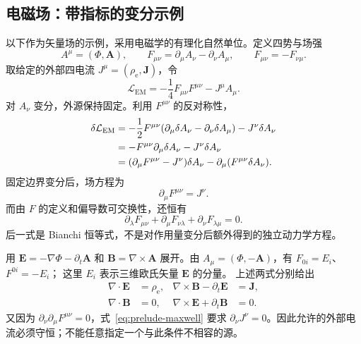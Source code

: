\subsection{电磁场：带指标的变分示例}

以下作为矢量场的示例，采用电磁学的有理化自然单位。定义四势与场强
\begin{equation}
  A^{\mu}=(\Phi,\bm{A}),\qquad
  F_{\mu\nu}=\partial_{\mu}A_{\nu}-\partial_{\nu}A_{\mu},
  \qquad F_{\mu\nu}=-F_{\nu\mu}.
\end{equation}
取给定的外部四电流 $J^{\mu}=(\rho_{\mathrm{e}},\bm{J})$，令
\begin{equation}
  \mathcal{L}_{\mathrm{EM}}=-\frac14F_{\mu\nu}F^{\mu\nu}-J^{\mu}A_{\mu}.
\end{equation}
对 $A_{\nu}$ 变分，外源保持固定。利用 $F^{\mu\nu}$ 的反对称性，
\begin{align}
  \delta\mathcal{L}_{\mathrm{EM}}
  &=-\frac12F^{\mu\nu}(\partial_{\mu}\delta A_{\nu}
    -\partial_{\nu}\delta A_{\mu})-J^{\nu}\delta A_{\nu}\notag\\
  &=-F^{\mu\nu}\partial_{\mu}\delta A_{\nu}-J^{\nu}\delta A_{\nu}\notag\\
  &=(\partial_{\mu}F^{\mu\nu}-J^{\nu})\delta A_{\nu}
    -\partial_{\mu}(F^{\mu\nu}\delta A_{\nu}).
\end{align}
固定边界变分后，场方程为
\begin{equation}
  \partial_{\mu}F^{\mu\nu}=J^{\nu}.
  \label{eq:prelude-maxwell}
\end{equation}
而由 $F$ 的定义和偏导数可交换性，还恒有
\begin{equation}
  \partial_{\lambda}F_{\mu\nu}
  +\partial_{\mu}F_{\nu\lambda}
  +\partial_{\nu}F_{\lambda\mu}=0.
  \label{eq:prelude-bianchi}
\end{equation}
后一式是 Bianchi 恒等式，不是对作用量变分后额外得到的独立动力学方程。

用 $\bm{E}=-\nabla\Phi-\partial_{t}\bm{A}$ 和
$\bm{B}=\nabla\times\bm{A}$ 展开。由
$A_{\mu}=(\Phi,-\bm{A})$，有 $F_{0i}=E_{i}$、$F^{0i}=-E_{i}$；
这里 $E_{i}$ 表示三维欧氏矢量 $\bm{E}$ 的分量。
上述两式分别给出
\begin{align}
  \nabla\cdot\bm{E}&=\rho_{\mathrm{e}},
  &\nabla\times\bm{B}-\partial_{t}\bm{E}&=\bm{J},\\
  \nabla\cdot\bm{B}&=0,
  &\nabla\times\bm{E}+\partial_{t}\bm{B}&=0.
\end{align}
又因为 $\partial_{\nu}\partial_{\mu}F^{\mu\nu}=0$，式~\eqref{eq:prelude-maxwell} 要求 $\partial_{\nu}J^{\nu}=0$。因此允许的外部电流必须守恒；不能任意指定一个与此条件不相容的源。

